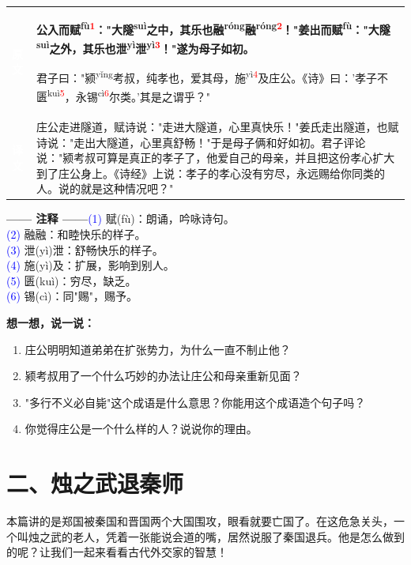 \documentclass[a4paper,12pt]{ctexart}
\makeatletter
\newcommand{\ruby}[2]{#1\textsuperscript{#2}}
\newlength{\colA}\setlength{\colA}{0.06\textwidth}
\newlength{\colB}\setlength{\colB}{0.64\textwidth}
\newlength{\colC}\setlength{\colC}{0.26\textwidth}
\newcommand{\sectab}[3]{%
  \noindent
  \begin{minipage}[c]{\dimexpr\colA+\colB+2\tabcolsep\relax}
  \begin{tabular}{@{}p{\colA}p{\colB}@{}}
  \sideyuan  & {\large\bfseries #1} \\
  \sideyiwen & {\large #2} \\
  \end{tabular}
  \end{minipage}
  \hfill
  \begin{minipage}[c]{\colC}
  {\labelann\vspace{0.1cm}}#3
  \end{minipage}
  \par
}
\newcommand{\sideyuan}{\colorbox{blue!70!black}{\textcolor{white}{\normalsize\textbf{原文}}}}
\newcommand{\sideyiwen}{\colorbox{green!60!black}{\textcolor{white}{\normalsize\textbf{译文}}}}
\newcommand{\labelann}{\textcolor{orange!80!black}{\small\textbf{—— 注释 ——}}}
\newcommand{\refmark}[1]{\textsuperscript{\textcolor{red}{#1}}}
\makeatother
\begin{document}
\sectab{公入而\ruby{赋}{fù}\refmark{1}："大\ruby{隧}{suì}之中，其乐也\ruby{融}{róng}\ruby{融}{róng}\refmark{2}！"姜出而\ruby{赋}{fù}："大\ruby{隧}{suì}之外，其乐也\ruby{泄}{yì}\ruby{泄}{yì}\refmark{3}！"遂为母子如初。\par
君子曰："\ruby{颍}{yǐng}考叔，纯孝也，爱其母，\ruby{施}{yì}\refmark{4}及庄公。《诗》曰：'孝子不\ruby{匮}{kuì}\refmark{5}，永\ruby{锡}{cì}\refmark{6}尔类。'其是之谓乎？"}{庄公走进隧道，赋诗说："走进大隧道，心里真快乐！"姜氏走出隧道，也赋诗说："走出大隧道，心里真舒畅！"于是母子俩和好如初。君子评论说："颍考叔可算是真正的孝子了，他爱自己的母亲，并且把这份孝心扩大到了庄公身上。《诗经》上说：孝子的孝心没有穷尽，永远赐给你同类的人。说的就是这种情况吧？"}{{\small \textcolor{blue}{(1)} 赋(fù)：朗诵，吟咏诗句。}\\[0.1cm]{\small \textcolor{blue}{(2)} 融融：和睦快乐的样子。}\\[0.1cm]{\small \textcolor{blue}{(3)} 泄(yì)泄：舒畅快乐的样子。}\\[0.1cm]{\small \textcolor{blue}{(4)} 施(yì)及：扩展，影响到别人。}\\[0.1cm]{\small \textcolor{blue}{(5)} 匮(kuì)：穷尽，缺乏。}\\[0.1cm]{\small \textcolor{blue}{(6)} 锡(cì)：同"赐"，赐予。}}

\vspace{0.3cm}
{\large\textcolor{orange!80!black}{\textbf{想一想，说一说：}}}
\begin{enumerate}
  \item 庄公明明知道弟弟在扩张势力，为什么一直不制止他？
  \item 颍考叔用了一个什么巧妙的办法让庄公和母亲重新见面？
  \item "多行不义必自毙"这个成语是什么意思？你能用这个成语造个句子吗？
  \item 你觉得庄公是一个什么样的人？说说你的理由。
\end{enumerate}

\newpage

\section*{\textcolor{orange!80!black}{二、烛之武退秦师}}

本篇讲的是郑国被秦国和晋国两个大国围攻，眼看就要亡国了。在这危急关头，一个叫烛之武的老人，凭着一张能说会道的嘴，居然说服了秦国退兵。他是怎么做到的呢？让我们一起来看看古代外交家的智慧！
\end{document}
